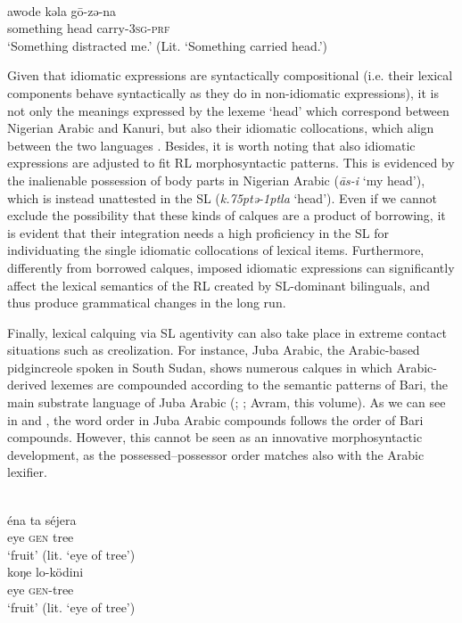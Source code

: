 \documentclass[output=paper]{langsci/langscibook}
\begin{document}
\\
\gll   awode kǝla   gō-zǝ-na \\
       something head carry-\textsc{3sg-prf}\\
\glt   `Something distracted me.' (Lit. ‘Something carried head.’)
\z
\z

Given that idiomatic expressions are syntactically compositional (i.e. their lexical components behave syntactically as they do in non-idiomatic expressions), it is not only the meanings expressed by the lexeme ‘head’ which correspond between Nigerian Arabic and Kanuri, but also their idiomatic collocations, which align between the two languages \citep[157]{Owens2014}. Besides, it is worth noting that also idiomatic expressions are adjusted to fit RL morphosyntactic patterns. This is evidenced by the inalienable possession of body parts in Nigerian Arabic (\textit{{\R}ās-i} ‘my head’), which is instead unattested in the SL (\textit{k\kern .75ptǝ\kern -1ptla} ‘head’). Even if we cannot exclude the possibility that these kinds of calques are a product of borrowing, it is evident that their integration needs a high proficiency in the SL for individuating the single idiomatic collocations of lexical items. Furthermore, differently from borrowed calques, imposed idiomatic expressions can significantly affect the lexical semantics of the RL created by SL-dominant bilinguals, and thus produce grammatical changes in the long run. 

Finally, lexical calquing via SL agentivity can also take place in extreme contact situations such as creolization. For instance, Juba Arabic, the Arabic-based pidgincreole spoken in South Sudan, shows numerous calques in which Arabic-derived lexemes are compounded according to the semantic patterns of Bari, the main substrate language of Juba Arabic (\citealt{Nakao2012}; \citealt[50]{Manfredi2017}; Avram, this volume). As we can see in  and , the word order in Juba Arabic compounds follows the order of Bari compounds. However, this cannot be seen as an innovative morphosyntactic development, as the possessed–possessor order matches also with the Arabic lexifier. 

\ea\label{ex:key:tree}
 \\
\gll   éna ta séjera  \\
       eye \textsc{gen} tree \\
\glt   `fruit’ (lit. ‘eye of tree’)
\newpage
{}\\
\gll   koŋe lo-ködini\\
       eye \textsc{gen}-tree\\
\glt   `fruit’ (lit. ‘eye of tree’)
\z
\z
\end{document}
